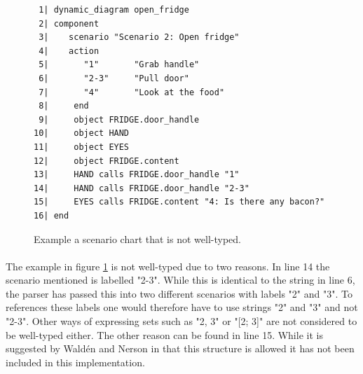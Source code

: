 \begin{figure}[H]
{\footnotesize
\begin{verbatim}
 1| dynamic_diagram open_fridge
 2| component
 3|    scenario "Scenario 2: Open fridge"
 4|    action
 5|       "1"       "Grab handle"
 6|       "2-3"     "Pull door"
 7|       "4"       "Look at the food"
 8|     end
 9|     object FRIDGE.door_handle 
10|     object HAND
11|     object EYES
12|     object FRIDGE.content
13|     HAND calls FRIDGE.door_handle "1"
14|     HAND calls FRIDGE.door_handle "2-3"
15|     EYES calls FRIDGE.content "4: Is there any bacon?"
16| end
\end{verbatim}
}
\caption{Example a scenario chart that is not well-typed.}
\label{fig:not_well_typed}
\end{figure}

\paragraph{}
The example in figure \ref{fig:not_well_typed} is not well-typed due to two reasons. In line 14 the scenario mentioned is labelled "2-3". While this is identical to the string in line 6, the parser has passed this into two different scenarios with labels "2" and "3". To references these labels one would therefore have to use strings "2" and "3" and not "2-3". Other ways of expressing sets such as "2, 3" or "[2; 3]" are not considered to be well-typed either. The other reason can be found in line 15. While it is suggested by Wald\'{e}n and Nerson in \cite{walden1995} that this structure is allowed it has not been included in this implementation.